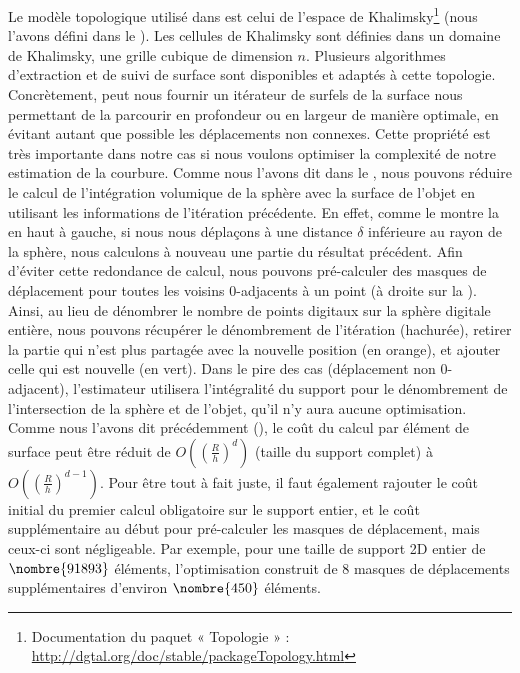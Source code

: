 Le modèle topologique utilisé dans \DGtal est celui de l'espace de
Khalimsky\footnote{Documentation du paquet « Topologie » :
\url{http://dgtal.org/doc/stable/packageTopology.html}} (nous l'avons défini
dans le ). Les cellules de Khalimsky sont définies
dans un domaine de Khalimsky, \cad une grille cubique de dimension $n$.
Plusieurs algorithmes d'extraction et de suivi de surface sont disponibles et
adaptés à cette topologie. Concrètement, \DGtal peut nous fournir un itérateur
de surfels de la surface nous permettant de la parcourir en profondeur ou en
largeur de manière optimale, \cad en évitant autant que possible les
déplacements non connexes. Cette propriété est très importante dans notre cas si
nous voulons optimiser la complexité de notre estimation de la courbure. Comme
nous l'avons dit dans le , nous pouvons réduire le
calcul de l'intégration volumique de la sphère avec la surface de l'objet en
utilisant les informations de l'itération précédente. En effet, comme le montre
la  en haut à gauche, si nous nous déplaçons à une
distance $\delta$ inférieure au rayon de la sphère, nous calculons à nouveau une
partie du résultat précédent. Afin d'éviter cette redondance de calcul, nous
pouvons pré-calculer des masques de déplacement pour toutes les voisins
$0$-adjacents à un point (à droite sur la ).
Ainsi, au lieu de dénombrer le nombre de points digitaux sur la sphère digitale
entière, nous pouvons récupérer le dénombrement de l'itération (hachurée),
retirer la partie qui n'est plus partagée avec la nouvelle position (en orange),
et ajouter celle qui est nouvelle (en vert).
Dans le pire des cas (déplacement non $0$-adjacent), l'estimateur utilisera
l'intégralité du support pour le dénombrement de l'intersection de la sphère et
de l'objet, \cad qu'il n'y aura aucune optimisation. Comme nous l'avons dit
précédemment (), le coût du calcul par élément de
surface peut être réduit de $O\left(\left(\frac{R}{h}\right)^d\right)$ (taille du support complet) à
$O\left(\left(\frac{R}{h}\right)^{d-1}\right)$. Pour être tout à fait juste, il faut également
rajouter le coût initial du premier calcul obligatoire sur le support entier, et
le coût supplémentaire au début pour pré-calculer les masques de déplacement,
mais ceux-ci sont négligeable. Par exemple, pour une taille de support 2D entier
de $\nombre{91893}$ éléments, l'optimisation construit de $8$ masques de
déplacements supplémentaires d'environ $\nombre{450}$ éléments.

